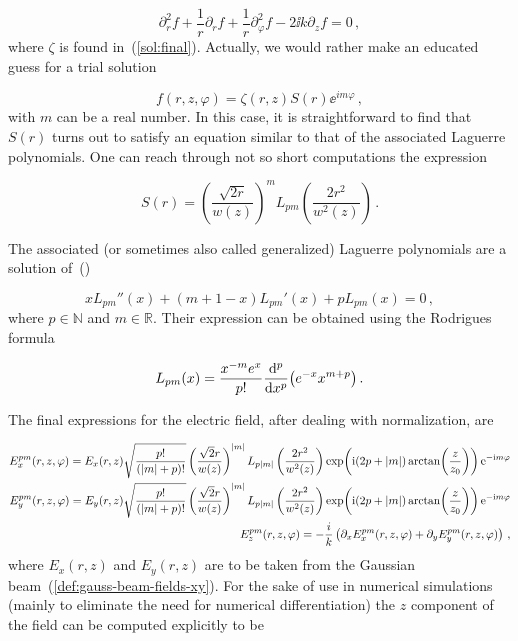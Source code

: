 \documentclass[12pt, class=report, crop=false]{standalone}
\begin{document}
\begin{equation}
  \partial_r^2 f +\frac{1}{r} \partial_r f + \frac{1}{r} \partial_\varphi^2 f - 2 \ii k \partial_z f = 0 \,,
\end{equation}
where \(\zeta\) is found in~(\ref{sol:final}). Actually, we would rather make an educated guess for a trial solution

\begin{equation}
  f(r,z,\varphi) = \zeta (r,z) S(r) \ee^{im\varphi}\,,
\end{equation}
with \(m\) can be a real number. In this case, it is straightforward to find that \(S(r)\) turns out to satisfy an equation similar to that of the associated Laguerre polynomials. One can reach through not so short computations the expression

\begin{equation}
  S(r) = \left(\frac{\sqrt{2r}}{w(z)}\right)^m L_{pm}\left(\frac{2r^2}{w^2(z)}\right)\,.
\end{equation}

The associated (or sometimes also called generalized) Laguerre polynomials are a solution of~(\cite{abramowitzHandbookMathematicalFunctions2013})

\begin{equation}
  x L_{pm}''(x) + (m+1-x) L_{pm}'(x) + p L_{pm}(x) =0\,,
\end{equation}
where \(p\in\mathbb{N}\) and \(m\in\mathbb{R}\).
Their expression can be obtained using the Rodrigues formula

\begin{equation}
  L_{pm} (x) = \frac{x^{-m} e^x}{p!} \dv[p]{x} (e^{-x} x^{m+p})\,.
\end{equation}

The final expressions for the electric field, after dealing with normalization, are

\begin{subequations}
  \begin{align}
    E_x^{pm} (r,z,\varphi) = E_x(r,z) \sqrt{\frac{p!}{(\abs{m}+p)!}} \left(\frac{\sqrt{2}r}{w(z)}\right)^{\abs{m}} L_{p\abs{m}} \left(\frac{2r^2}{w^2(z)}\right) \exp(\mathrm{i} (2p+\abs{m}) \arctan(\frac{z}{z_0}))\operatorname{e}^{-\mathrm{i} m \varphi} \\
    E_y^{pm} (r,z,\varphi) = E_y(r,z) \sqrt{\frac{p!}{(\abs{m}+p)!}} \left(\frac{\sqrt{2}r}{w(z)}\right)^{\abs{m}} L_{p\abs{m}} \left(\frac{2r^2}{w^2(z)}\right) \exp(\mathrm{i} (2p+\abs{m}) \arctan(\frac{z}{z_0}))\operatorname{e}^{-\mathrm{i} m \varphi} \\
    E_z^{pm} (r,z,\varphi) = - \frac{i}{k} \left(\partial_x E_x^{pm} (r,z,\varphi) + \partial_y E_y^{pm} (r,z,\varphi) \right) \,,
  \end{align}
\end{subequations}
where \(E_x(r,z)\) and \(E_y(r,z)\) are to be taken from the Gaussian beam~(\ref{def:gauss-beam-fields-xy}). For the sake of use in numerical simulations (mainly to eliminate the need for numerical differentiation) the \(z\) component of the field can be computed explicitly to be
\end{document}
